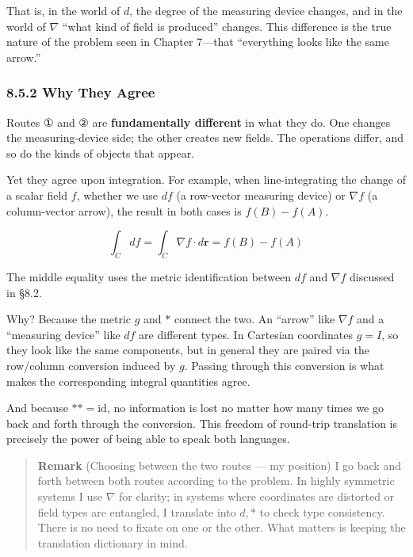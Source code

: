 That is, in the world of \(d\), the degree of the measuring device
changes, and in the world of \(\nabla\) ``what kind of field is
produced'' changes. This difference is the true nature of the problem
seen in Chapter 7---that ``everything looks like the same arrow.''

\hypertarget{why-they-agree}{%
\subsubsection{8.5.2 Why They Agree}\label{why-they-agree}}

Routes ① and ② are \textbf{fundamentally different} in what they do. One
changes the measuring-device side; the other creates new fields. The
operations differ, and so do the kinds of objects that appear.

Yet they agree upon integration. For example, when line-integrating the
change of a scalar field \(f\), whether we use \(df\) (a row-vector
measuring device) or \(\nabla f\) (a column-vector arrow), the result in
both cases is \(f(B)-f(A)\).

\[\int_C df = \int_C \nabla f \cdot d\mathbf{r} = f(B) - f(A)\]

The middle equality uses the metric identification between \(df\) and
\(\nabla f\) discussed in §8.2.

Why? Because the metric \(g\) and \(\ast\) connect the two. An ``arrow''
like \(\nabla f\) and a ``measuring device'' like \(df\) are different
types. In Cartesian coordinates \(g=I\), so they look like the same
components, but in general they are paired via the row/column conversion
induced by \(g\). Passing through this conversion is what makes the
corresponding integral quantities agree.

And because \(\ast\ast = \mathrm{id}\), no information is lost no matter
how many times we go back and forth through the conversion. This freedom
of round-trip translation is precisely the power of being able to speak
both languages.

\begin{quote}
\textbf{Remark} (Choosing between the two routes --- my position) I go
back and forth between both routes according to the problem. In highly
symmetric systems I use \(\nabla\) for clarity; in systems where
coordinates are distorted or field types are entangled, I translate into
\(d,\ast\) to check type consistency. There is no need to fixate on one
or the other. What matters is keeping the translation dictionary in
mind.
\end{quote}

